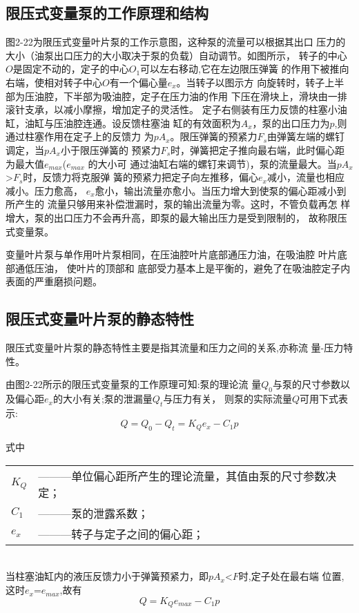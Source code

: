 \subsection*{限压式变量泵的工作原理和结构} 
图2-22为限压式变量叶片泵的工作示意图，这种泵的流量可以根据其出口
压力的大小（油泵出口压力的大小取决于泵的负载）自动调节。如图所示， 
转子的中心$O$是固定不动的，定子的中心$O_1$可以左右移动,它在左边限压弹簧
的作用下被推向右端，使相对转子中心$O$有一个偏心量$e_x$。当转子以图示方
向旋转时，转子上半部为压油腔，下半部为吸油腔，定子在压力油的作用
下压在滑块上，滑块由一排滚针支承，以减小摩擦，增加定子的灵活性。
定子右侧装有压力反馈的柱塞小油缸，油缸与压油腔连通。设反馈柱塞油
缸的有效面积为$A_x$，泵的出口压力为$p$,则通过柱塞作用在定子上的反馈力
为$p$$A_x$。限压弹簧的预紧力$F_s$由弹簧左端的螺钉调定，当$p$$A_x$小于限压弹簧的
预紧力$F_s$时，弹簧把定子推向最右端，此时偏心距为最大值$e_{max}$($e_{max}$
的大小可
通过油缸右端的螺钉来调节)，泵的流量最大。当$p$$A_x$>$F_s$时，反馈力将克服弹
簧的预紧力把定子向左推移，偏心$e_x$减小，流量也相应减小。压力愈高，
$e_x$愈小，输出流量亦愈小。当压力增大到使泵的偏心距减小到所产生的
流量只够用来补偿泄漏时，泵的输出流量为零。这时，不管负载再怎
样增大，泵的出口压力不会再升高，即泵的最大输出压力是受到限制的，
故称限压式变量泵。

变量叶片泵与单作用叶片泵相同，在压油腔叶片底部通压力油，在吸油腔
叶片底部通低压油，
使叶片的顶部和
底部受力基本上是平衡的，避免了在吸油腔定子内表面的严重磨损问题。
\subsection*{限压式变量叶片泵的静态特性}
限压式变量叶片泵的静态特性主要是指其流量和压力之间的关系,亦称流
量-压力特性。

由图2-22所示的限压式变量泵的工作原理可知:泵的理论流
量$Q_0$与泵的尺寸参数以及偏心距$e_x$的大小有关;泵的泄漏量$Q_t$与压力有关，
则泵的实际流量$Q$可用下式表示:
    \begin{equation*}
        Q=Q_0-Q_t=K_Qe_x-C_1p
    \end{equation*}   

式中
\begin{tabular}[t]{ll}
    $K_Q$&———单位偏心距所产生的理论流量，其值由泵的尺寸参数决定；\\
    $C_1$&———泵的泄露系数；\\
    $e_x$&———转子与定子之间的偏心距；
\end{tabular}\\

当柱塞油缸内的液压反馈力小于弹簧预紧力，即$p$$A_x$<$F$时,定子处在最右端
位置,这时$e_x$=$e_{max}$,故有
\begin{equation*}
    Q=K_Qe_{max}-C_1p
\end{equation*}

